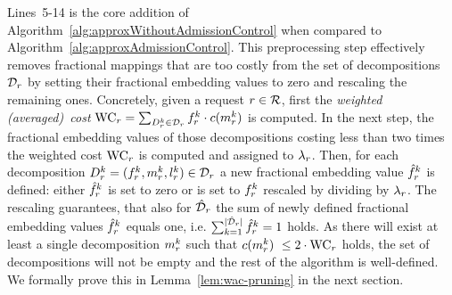 \documentclass[10pt, conference, letterpaper]{IEEEtran}
\begin{document}
Lines~5-14 is the core addition of Algorithm~\ref{alg:approxWithoutAdmissionControl} when compared to Algorithm~\ref{alg:approxAdmissionControl}. This preprocessing step effectively removes fractional mappings that are too costly from the set of decompositions $\PotEmbeddings$ by setting their fractional embedding values to zero and rescaling the remaining ones. Concretely, given a request $r \in \mathcal{R}$, first the \emph{weighted (averaged)~cost} $\WAC = \sum_{\decomp \in \PotEmbeddings} \prob \cdot c(\mapping)$ is computed. In the next step, the fractional embedding values of those decompositions costing less than two times the weighted cost $\WAC$ is computed and assigned to $\lambda_{r}$. Then, for each decomposition $\decomp = (\prob,\mapping,\load) \in  \PotEmbeddings$ a new fractional embedding value $\probHat$ is defined: either $\probHat$ is set to zero or is set to $\prob$ rescaled by dividing by $\lambda_{r}$. The rescaling guarantees, that also for  $\PotEmbeddingsHat$ the sum of newly defined fractional embedding values $\probHat$ equals one, i.e. $\sum_{k=1}^{|\PotEmbeddingsHat|} \probHat = 1$ holds. As there will exist at least a single decomposition $\mapping$ such that $c(\mapping)~\leq 2\cdot \WAC$ holds, the set of decompositions will not be empty and the rest of the algorithm is well-defined. We formally prove this in Lemma~\ref{lem:wac-pruning} in the next section.
\end{document}
